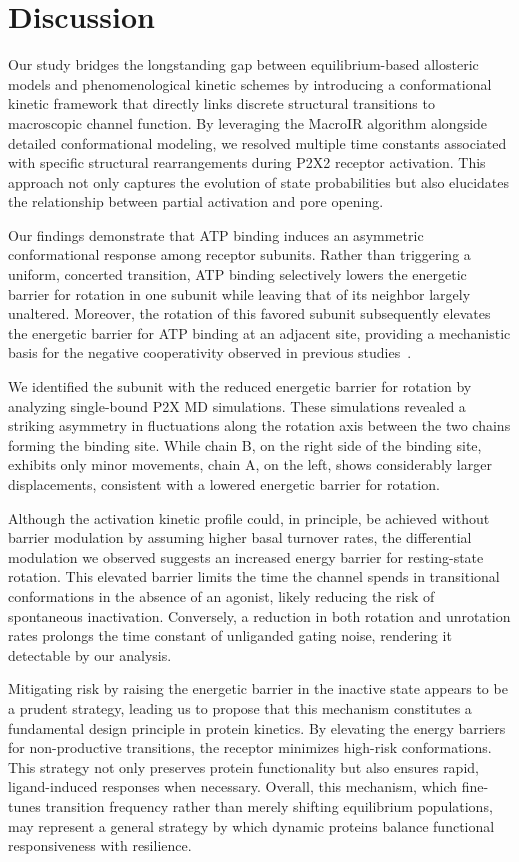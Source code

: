 \documentclass[pdflatex,sn-nature]{sn-jnl}%
\begin{document}
\section{Discussion}
Our study bridges the longstanding gap between equilibrium-based allosteric models and phenomenological kinetic schemes by introducing a conformational kinetic framework that directly links discrete structural transitions to macroscopic channel function. By leveraging the MacroIR algorithm alongside detailed conformational modeling, we resolved multiple time constants associated with specific structural rearrangements during P2X2 receptor activation. This approach not only captures the evolution of state probabilities but also elucidates the relationship between partial activation and pore opening.

Our findings demonstrate that ATP binding induces an asymmetric conformational response among receptor subunits. Rather than triggering a uniform, concerted transition, ATP binding selectively lowers the energetic barrier for rotation in one subunit while leaving that of its neighbor largely unaltered. Moreover, the rotation of this favored subunit subsequently elevates the energetic barrier for ATP binding at an adjacent site, providing a mechanistic basis for the negative cooperativity observed in previous studies~\cite{Sattler2020UnravellingTI}.

We identified the subunit with the reduced energetic barrier for rotation by analyzing single-bound P2X MD simulations. These simulations revealed a striking asymmetry in fluctuations along the rotation axis between the two chains forming the binding site. While chain B, on the right side of the binding site, exhibits only minor movements, chain A, on the left, shows considerably larger displacements, consistent with a lowered energetic barrier for rotation.

Although the activation kinetic profile could, in principle, be achieved without barrier modulation by assuming higher basal turnover rates, the differential modulation we observed suggests an increased energy barrier for resting-state rotation. This elevated barrier limits the time the channel spends in transitional conformations in the absence of an agonist, likely reducing the risk of spontaneous inactivation. Conversely, a reduction in both rotation and unrotation rates prolongs the time constant of unliganded gating noise, rendering it detectable by our analysis.

Mitigating risk by raising the energetic barrier in the inactive state appears to be a prudent strategy, leading us to propose that this mechanism constitutes a fundamental design principle in protein kinetics. By elevating the energy barriers for non-productive transitions, the receptor minimizes high-risk conformations. This strategy not only preserves protein functionality but also ensures rapid, ligand-induced responses when necessary. Overall, this mechanism, which fine-tunes transition frequency rather than merely shifting equilibrium populations, may represent a general strategy by which dynamic proteins balance functional responsiveness with resilience.
\end{document}
